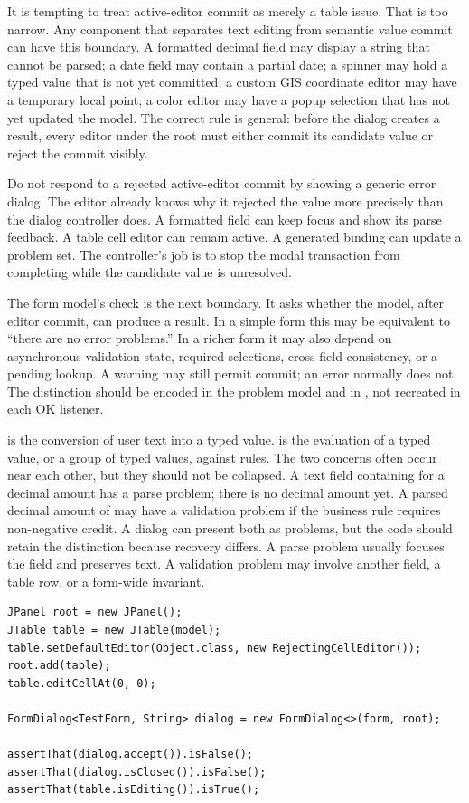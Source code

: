 It is tempting to treat active-editor commit as merely a table issue. That is
too narrow. Any component that separates text editing from semantic value
commit can have this boundary. A formatted decimal field may display a string
that cannot be parsed; a date field may contain a partial date; a spinner may
hold a typed value that is not yet committed; a custom GIS coordinate editor
may have a temporary local point; a color editor may have a popup selection
that has not yet updated the model. The correct rule is general: before the
dialog creates a result, every editor under the root must either commit its
candidate value or reject the commit visibly.

Do not respond to a rejected active-editor commit by showing a generic error
dialog. The editor already knows why it rejected the value more precisely than
the dialog controller does. A formatted field can keep focus and show its
parse feedback. A table cell editor can remain active. A generated binding can
update a problem set. The controller's job is to stop the modal transaction
from completing while the candidate value is unresolved.

The form model's  check is the next boundary. It asks
whether the model, after editor commit, can produce a result. In a simple form
this may be equivalent to ``there are no error problems.'' In a richer form it
may also depend on asynchronous validation state, required selections,
cross-field consistency, or a pending lookup. A warning may still permit
commit; an error normally does not. The distinction should be encoded in the
problem model and in , not recreated in each OK listener.

 is the conversion of user text into a
typed value.  is the evaluation of a typed value, or a
group of typed values, against rules. The two concerns often occur near each
other, but they should not be collapsed. A text field containing  for
a decimal amount has a parse problem; there is no decimal amount yet. A parsed
decimal amount of  may have a validation problem if the business rule
requires non-negative credit. A dialog can present both as problems, but the
code should retain the distinction because recovery differs. A parse problem
usually focuses the field and preserves text. A validation problem may involve
another field, a table row, or a form-wide invariant.

\begin{lstlisting}[caption={A minimal active-editor test shape.}]
JPanel root = new JPanel();
JTable table = new JTable(model);
table.setDefaultEditor(Object.class, new RejectingCellEditor());
root.add(table);
table.editCellAt(0, 0);

FormDialog<TestForm, String> dialog = new FormDialog<>(form, root);

assertThat(dialog.accept()).isFalse();
assertThat(dialog.isClosed()).isFalse();
assertThat(table.isEditing()).isTrue();
\end{lstlisting}

